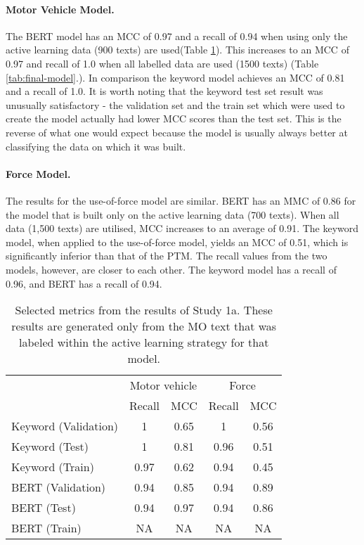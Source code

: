 \paragraph{Motor Vehicle Model.} The BERT model has an MCC of 0.97 and a recall of 0.94 when using only the active learning data (900 texts) are used(Table \ref{tab:results_study_1}). This increases to an MCC of 0.97 and recall of 1.0 when all labelled data are used (1500 texts) (Table \ref{tab:final-model}.). In comparison the keyword model achieves an MCC of 0.81 and a recall of 1.0. It is worth noting that the keyword test set result was unusually satisfactory - the validation set and the train set which were used to create the model actually had lower MCC scores than the test set. This is the reverse of what one would expect because the model is usually always better at classifying the data on which it was built.

\paragraph{Force Model.} The results for the use-of-force model are similar. BERT has an MMC of 0.86 for the model that is built only on the active learning data (700 texts). When all data (1,500 texts) are utilised, MCC increases to an average of 0.91. The keyword model, when applied to the use-of-force model, yields an MCC of 0.51, which is significantly inferior than that of the PTM. The recall values from the two models, however, are closer to each other. The keyword model has a recall of 0.96, and BERT has a recall of 0.94.

\begin{table}[]
\begin{tabular}{@{}lcccc@{}}
\toprule
                         & \multicolumn{2}{c}{Motor vehicle} & \multicolumn{2}{c}{Force} \\ 
                         & Recall           & MCC            & Recall       & MCC        \\\midrule
Keyword (Validation)     & 1                & 0.65           & 1            & 0.56       \\
Keyword (Test)           & 1                & 0.81           & 0.96         & 0.51       \\
Keyword (Train)          & 0.97             & 0.62           & 0.94         & 0.45       \\\midrule
BERT (Validation)        & 0.94                & 0.85           & 0.94            & 0.89          \\
BERT (Test)              & 0.94                & 0.97           &0.94           & 0.86         \\
BERT (Train)             & NA               & NA             & NA           & NA         \\ \bottomrule
\end{tabular}
\caption[Model metrics. PF1 data. Force used and motor vehicle model.]{\label{tab:results_study_1} Selected metrics from the results of Study 1a. These results are generated only from the MO text that was labeled within the active learning strategy for that model.}
\end{table}


